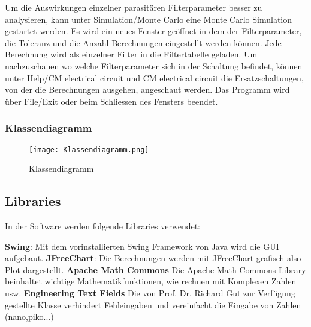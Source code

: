 Um die Auswirkungen einzelner parasitären Filterparameter besser zu analysieren, kann unter Simulation/Monte Carlo eine Monte Carlo Simulation gestartet werden. Es wird ein neues Fenster geöffnet in dem der Filterparameter, die Toleranz und die Anzahl Berechnungen eingestellt werden können. Jede Berechnung wird als einzelner Filter in die Filtertabelle geladen. Um nachzuschauen wo welche Filterparameter sich in der Schaltung befindet, können unter Help/CM electrical circuit und CM electrical circuit die Ersatzschaltungen, von der die Berechnungen ausgehen, angeschaut werden. Das Programm wird über File/Exit oder beim Schliessen des Fensters beendet.

\newpage

\subsubsection{Klassendiagramm} \label{subsubsec:Klassendiagramm}

\begin{figure}[H]
	\centering
	\texttt{[image: Klassendiagramm.png]}
	\caption{Klassendiagramm}
	\label{fig:Klassendiagramm}
\end{figure} 

\newpage


\subsection{Libraries} \label{subsec:Libraries}

In der Software werden folgende Libraries verwendet:

\textbf{Swing}: Mit dem vorinstallierten Swing Framework von Java wird die GUI aufgebaut.
\textbf{JFreeChart}: Die Berechnungen werden mit JFreeChart grafisch also Plot dargestellt. \cite{jfreechart}
\textbf{Apache Math Commons} Die Apache Math Commons Library beinhaltet wichtige Mathematikfunktionen, wie rechnen mit Komplexen Zahlen usw. \cite{apache}
\textbf{Engineering Text Fields} Die von Prof. Dr. Richard Gut zur Verfügung gestellte Klasse verhindert Fehleingaben und vereinfacht die Eingabe von Zahlen (nano,piko...)

\newpage